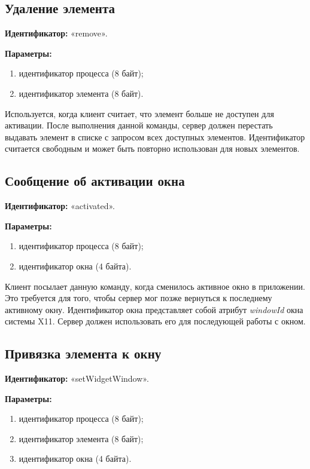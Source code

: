 \subsection{Удаление элемента}

\textbf{Идентификатор:} «remove».

\textbf{Параметры:}
\begin{enumerate}
\item идентификатор процесса (8 байт);
\item идентификатор элемента (8 байт).
\end{enumerate}

Используется, когда клиент считает, что элемент больше не доступен для
активации. После выполнения данной команды, сервер должен перестать выдавать
элемент в списке с запросом всех доступных элементов. Идентификатор считается
свободным и может быть повторно использован для новых элементов.

\subsection{Сообщение об активации окна}

\textbf{Идентификатор:} «activated».

\textbf{Параметры:}
\begin{enumerate}
\item идентификатор процесса (8 байт);
\item идентификатор окна (4 байта).
\end{enumerate}

Клиент посылает данную команду, когда сменилось активное окно в приложении. Это
требуется для того, чтобы сервер мог позже вернуться к последнему активному
окну. Идентификатор окна представляет собой атрибут \textit{windowId} окна
системы X11. Сервер должен использовать его для последующей работы с окном.

\subsection{Привязка элемента к окну}

\textbf{Идентификатор:} «setWidgetWindow».

\textbf{Параметры:}
\begin{enumerate}
\item идентификатор процесса (8 байт);
\item идентификатор элемента (8 байт);
\item идентификатор окна (4 байта).
\end{enumerate}

